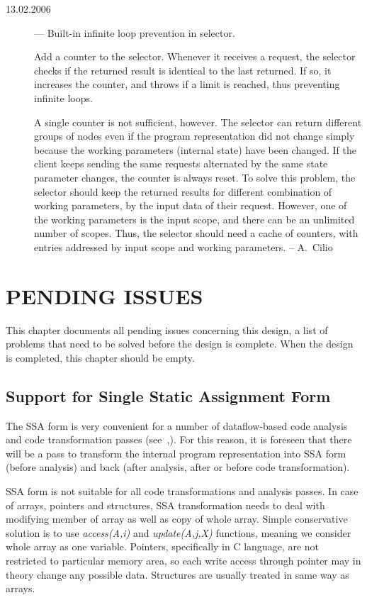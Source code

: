 \documentclass[a4paper,twoside]{tce}
\begin{document}
\begin{description}
\item[13.02.2006] --- Built-in infinite loop prevention in selector.

  Add a counter to the selector. Whenever it receives a request, the
  selector checks if the returned result is identical to the last returned.
  If so, it increases the counter, and throws if a limit is reached, thus
  preventing infinite loops.

  A single counter is not sufficient, however. The selector can return
  different groups of nodes even if the program representation did not
  change simply because the working parameters (internal state) have been
  changed. If the client keeps sending the same requests alternated by the
  same state parameter changes, the counter is always reset. To solve this
  problem, the selector should keep the returned results for different
  combination of working parameters, by the input data of their request.
  However, one of the working parameters is the input scope, and there can
  be an unlimited number of scopes. Thus, the selector should need a cache
  of counters, with entries addressed by input scope and working parameters.
%
  -- A.~Cilio
\end{description}



\chapter{PENDING ISSUES}

This chapter documents all pending issues concerning this design, a list of
problems that need to be solved before the design is complete. When the
design is completed, this chapter should be empty.

\section{Support for Single Static Assignment Form}
\label{ch:pending:ssa}

The SSA form is very convenient for a number of dataflow-based code analysis
and code transformation passes (see~\cite{Cytron89},\cite{Cytron91}). For
this reason, it is foreseen that there will be a pass to transform the
internal program representation into SSA form (before analysis) and back
(after analysis, after or before code transformation).

SSA form is not suitable for all code transformations and analysis passes.
In case of arrays, pointers and structures, SSA transformation needs to deal
with modifying member of array as well as copy of whole array. Simple
conservative solution is to use \emph{access(A,i)} and \emph{update(A,j,X)}
functions, meaning we consider whole array as one variable.  Pointers,
specifically in C language, are not restricted to particular memory area, so
each write access through pointer may in theory change any possible data.
Structures are usually treated in same way as arrays.
\end{document}
